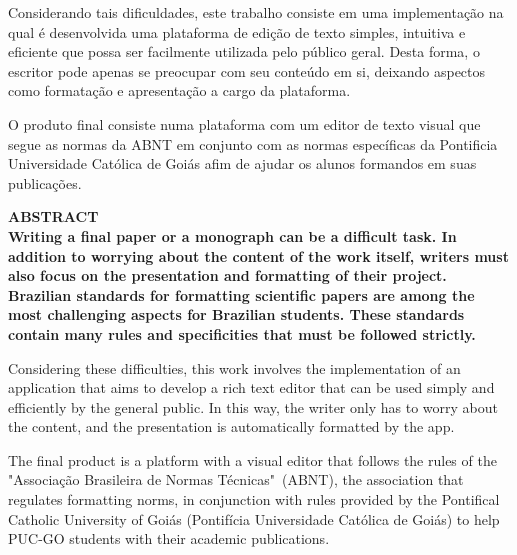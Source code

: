 \documentclass[12pt,a4paper,oneside,brazil]{abntex2}
\begin{document}
Considerando tais dificuldades, este trabalho consiste em uma implementação na qual é desenvolvida uma plataforma de edição de texto
simples, intuitiva e eficiente que possa ser facilmente utilizada pelo público geral.
Desta forma, o escritor pode apenas se preocupar com seu conteúdo em si, deixando aspectos como formatação e apresentação
a cargo da plataforma.

O produto final consiste numa plataforma com um editor de texto visual que segue as normas da ABNT em conjunto com as
normas específicas da Pontificia Universidade Católica de Goiás afim de ajudar os alunos formandos em suas publicações.
\clearpage

\centering
\ABNTEXchapterfont\bfseries{\textsc{\MakeUppercase{Abstract}}}\\
\vspace*{3cm}
\justifying
\normalfont
Writing a final paper or a monograph can be a difficult task. In addition to worrying about the content of the work itself, writers must also focus on the presentation and formatting of their project. Brazilian standards for formatting scientific papers are among the most challenging aspects for Brazilian students. These standards contain many rules and specificities that must be followed strictly.

Considering these difficulties, this work involves the implementation of an application that aims to develop a rich text editor that can be used simply and efficiently by the general public. In this way, the writer only has to worry about the content, and the presentation is automatically formatted by the app.

The final product is a platform with a visual editor that follows the rules of the "Associação Brasileira de Normas Técnicas"~(ABNT), the association that regulates formatting norms, in conjunction with rules provided by the Pontifical Catholic University of Goiás (Pontifícia Universidade Católica de Goiás) to help PUC-GO students with their academic publications.

\clearpage


\listoffigures   %
\clearpage

\listoftables    %
\clearpage




\tableofcontents
\clearpage



\setcounter{page}{1}
\textual

\justifying
\normalfont






\end{document}
